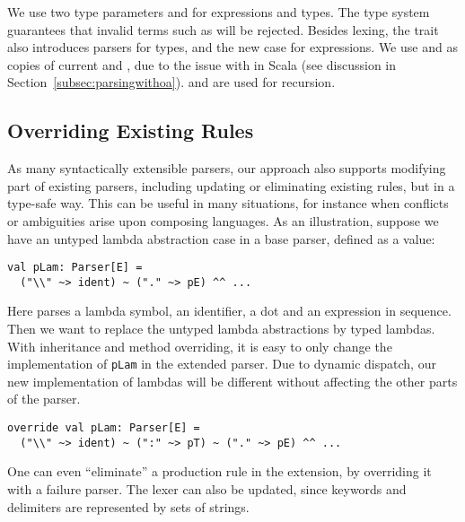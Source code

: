 We use two type parameters  and  for expressions and types. The type system guarantees that invalid terms such as  will be rejected.
Besides lexing, the trait  also introduces parsers for types, and the new case for expressions.
We use  and  as copies of current  and , due to the issue
with  in Scala (see discussion in Section~\ref{subsec:parsingwithoa}).  and  are used for recursion.

\vspace{-2pt}
\subsection{Overriding Existing Rules}\label{subsec:overriding-rules}

As many syntactically extensible parsers, our approach also supports
modifying part of existing parsers, including updating or eliminating existing rules,
but in a type-safe way. This can be useful in many
situations, for instance when conflicts or ambiguities arise upon composing languages.
As an illustration, suppose we have an untyped lambda abstraction case in a base parser, defined as a value:
\vspace{-4pt}
\begin{lstlisting}
val pLam: Parser[E] =
  ("\\" ~> ident) ~ ("." ~> pE) ^^ ...
\end{lstlisting}
\vspace{-4pt}
Here  parses a lambda symbol, an identifier, a dot and an expression in sequence.
Then we want to replace the untyped lambda abstractions by typed
lambdas. With inheritance and method overriding, it is easy to only
change the implementation of \lstinline{pLam} in the extended parser.
Due to dynamic dispatch, our new
implementation of lambdas will be different without affecting the other parts of the parser.
\vspace{-4pt}
\begin{lstlisting}
override val pLam: Parser[E] =
  ("\\" ~> ident) ~ (":" ~> pT) ~ ("." ~> pE) ^^ ...
\end{lstlisting}
\vspace{-4pt}

One can even ``eliminate'' a production rule in the extension, by overriding it with a failure parser. The lexer can also be updated, since keywords and delimiters are represented by sets of strings.


